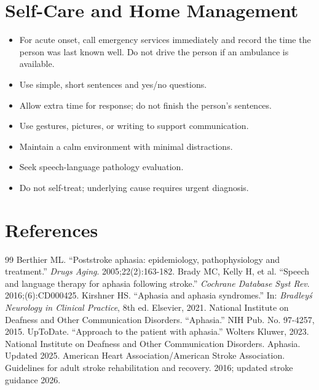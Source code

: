 \section*{Self-Care and Home Management}
\begin{itemize}
 \item For acute onset, call emergency services immediately and record the time the person was last known well. Do not drive the person if an ambulance is available.
 \item Use simple, short sentences and yes/no questions.
 \item Allow extra time for response; do not finish the person's sentences.
 \item Use gestures, pictures, or writing to support communication.
 \item Maintain a calm environment with minimal distractions.
 \item Seek speech-language pathology evaluation.
 \item Do not self-treat; underlying cause requires urgent diagnosis.
\end{itemize}

\section*{References}
\begin{thebibliography}{99}
 Berthier ML. ``Poststroke aphasia: epidemiology, pathophysiology and treatment.'' \textit{Drugs Aging}. 2005;22(2):163-182.
 Brady MC, Kelly H, et al. ``Speech and language therapy for aphasia following stroke.'' \textit{Cochrane Database Syst Rev}. 2016;(6):CD000425.
 Kirshner HS. ``Aphasia and aphasia syndromes.'' In: \textit{Bradley\'s Neurology in Clinical Practice}, 8th ed. Elsevier, 2021.
 National Institute on Deafness and Other Communication Disorders. ``Aphasia.'' NIH Pub. No. 97-4257, 2015.
 UpToDate. ``Approach to the patient with aphasia.'' Wolters Kluwer, 2023.
 National Institute on Deafness and Other Communication Disorders. Aphasia. Updated 2025.
 American Heart Association/American Stroke Association. Guidelines for adult stroke rehabilitation and recovery. 2016; updated stroke guidance 2026.
\end{thebibliography}
